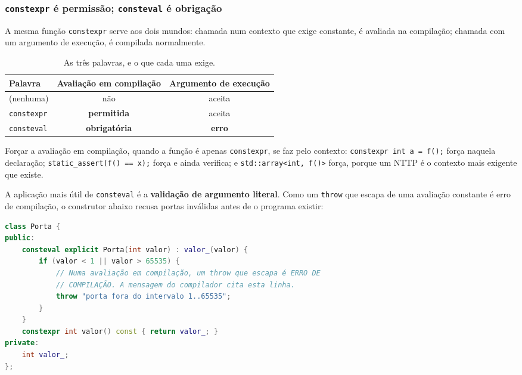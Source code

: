 \subsubsection{\texttt{constexpr} é permissão; \texttt{consteval} é obrigação}

A mesma função \texttt{constexpr} serve aos dois mundos: chamada num contexto
que exige constante, é avaliada na compilação; chamada com um argumento de
execução, é compilada normalmente.

\begin{table}[htbp]
\centering
\caption{As três palavras, e o que cada uma exige.}
\label{tab:constexpr-consteval}
\footnotesize
\begin{tabular}{@{}lcc@{}}
\toprule
\textbf{Palavra} & \textbf{Avaliação em compilação} & \textbf{Argumento de execução} \\
\midrule
(nenhuma)            & não                & aceita \\
\texttt{constexpr}   & \textbf{permitida} & aceita \\
\texttt{consteval}   & \textbf{obrigatória} & \textbf{erro} \\
\bottomrule
\end{tabular}
\end{table}

Forçar a avaliação em compilação, quando a função é apenas \texttt{constexpr},
se faz pelo contexto: \texttt{constexpr int a = f();} força naquela declaração;
\texttt{static\_assert(f() == x);} força e ainda verifica; e
\texttt{std::array<int, f()>} força, porque um NTTP é o contexto mais exigente
que existe.

A aplicação mais útil de \texttt{consteval} é a \textbf{validação de argumento
literal}. Como um \texttt{throw} que escapa de uma avaliação constante é erro de
compilação, o construtor abaixo recusa portas inválidas antes de o programa
existir:

\begin{lstlisting}[style=bt, language=C++,
    caption={Validação em compilação, em
             \texttt{src/compile\_time/demo\_consteval.hpp}.}]
class Porta {
public:
    consteval explicit Porta(int valor) : valor_(valor) {
        if (valor < 1 || valor > 65535) {
            // Numa avaliação em compilação, um throw que escapa é ERRO DE
            // COMPILAÇÃO. A mensagem do compilador cita esta linha.
            throw "porta fora do intervalo 1..65535";
        }
    }
    constexpr int valor() const { return valor_; }
private:
    int valor_;
};
\end{lstlisting}

